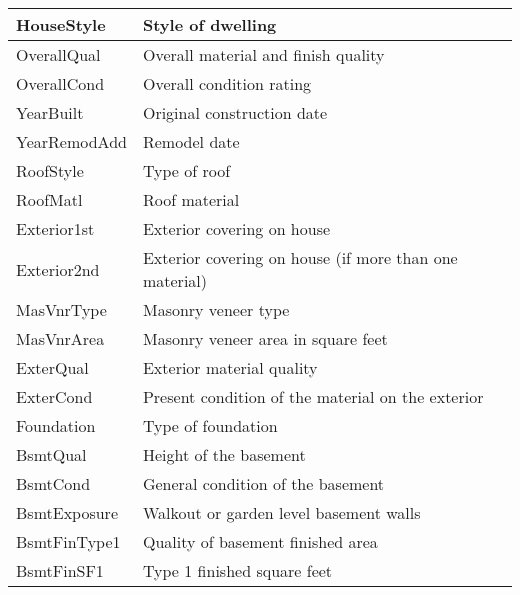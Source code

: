 \begin{table}[H]
\begin{longtable}{|l|l|}
        HouseStyle    & Style of dwelling                                           \\
        \hline
        OverallQual   & Overall material and finish quality                         \\
        \hline
        OverallCond   & Overall condition rating                                    \\
        \hline
        YearBuilt     & Original construction date                                  \\
        \hline
        YearRemodAdd  & Remodel date                                                \\
        \hline
        RoofStyle     & Type of roof                                                \\
        \hline
        RoofMatl      & Roof material                                               \\
        \hline
        Exterior1st   & Exterior covering on house                                  \\
        \hline
        Exterior2nd   & Exterior covering on house (if more than one material)      \\
        \hline
        MasVnrType    & Masonry veneer type                                         \\
        \hline
        MasVnrArea    & Masonry veneer area in square feet                          \\
        \hline
        ExterQual     & Exterior material quality                                   \\
        \hline
        ExterCond     & Present condition of the material on the exterior           \\
        \hline
        Foundation    & Type of foundation                                          \\
        \hline
        BsmtQual      & Height of the basement                                      \\
        \hline
        BsmtCond      & General condition of the basement                           \\
        \hline
        BsmtExposure  & Walkout or garden level basement walls                      \\
        \hline
        BsmtFinType1  & Quality of basement finished area                           \\
        \hline
        BsmtFinSF1    & Type 1 finished square feet                                 \\

\end{longtable}
\end{table}
